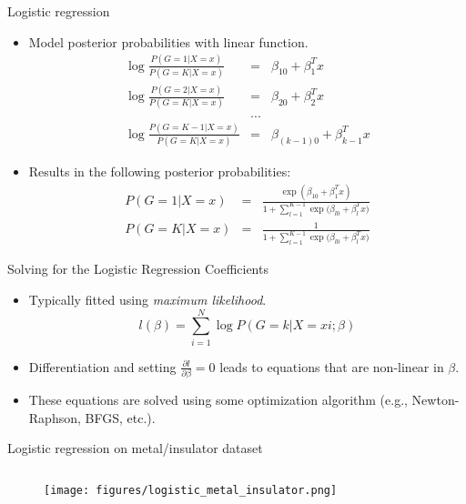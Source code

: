 \documentclass[aspectratio=169]{beamer}
\begin{document}
\begin{frame}{Logistic regression}
    \begin{itemize}
        \item Model posterior probabilities with linear function.
        \begin{eqnarray*}
            \log{\frac{P(G=1|X=x)}{P(G=K|X=x)}} & = & \beta_{10} + \beta_1^T x\\
            \log{\frac{P(G=2|X=x)}{P(G=K|X=x)}} & = & \beta_{20} + \beta_2^T x\\
            & ... &\\
            \log{\frac{P(G=K-1|X=x)}{P(G=K|X=x)}} & = & \beta_{(k-1)0} + \beta_{k-1}^T x
        \end{eqnarray*}
        \item Results in the following posterior probabilities:
        \begin{eqnarray*}
            P(G=1|X=x) & = & \frac{\exp{(\beta_{10} + \beta_1^T x)}}{1 + \sum_{l=1}^{K-1}\exp{(\beta_{l0} + \beta_l^T x})}\\
            P(G=K|X=x) & = & \frac{1}{1 + \sum_{l=1}^{K-1}\exp{(\beta_{l0} + \beta_l^T x})}
        \end{eqnarray*}
    \end{itemize}
\end{frame} 


\begin{frame}{Solving for the Logistic Regression Coefficients}
    \begin{itemize}
        \item Typically fitted using \textit{maximum likelihood}.
        \begin{equation*}
            l(\beta) = \sum_{i=1}^N \log {P(G = k | X = x i; \beta)}
        \end{equation*}
        \item Differentiation and setting $\frac{\partial{l}}{\partial{\beta}} = 0$ leads to equations that are non-linear in $\beta$.
        \item These equations are solved using some optimization algorithm (e.g., Newton-Raphson, BFGS, etc.). 
    \end{itemize}
\end{frame} 


\begin{frame}[fragile]{Logistic regression on metal/insulator dataset}
\inputminted{python}{example_sklearn_logistic__regression.py}
\begin{figure}
    \centering
    \texttt{[image: figures/logistic\_metal\_insulator.png]}
\end{figure}
\end{frame} 
\end{document}
